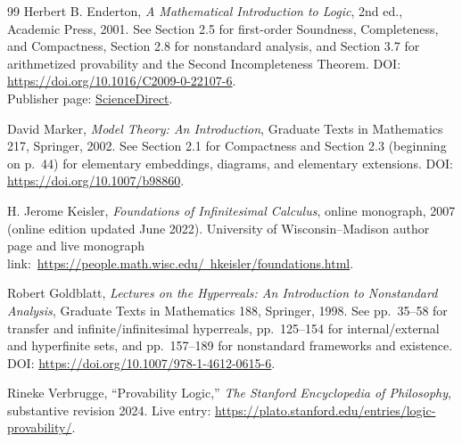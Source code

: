 \documentclass[11pt,openany]{book}
\theoremstyle{definition}
\theoremstyle{remark}
\begin{document}
\begin{thebibliography}{99}
Herbert B. Enderton,
\emph{A Mathematical Introduction to Logic}, 2nd ed., Academic Press, 2001.
See Section 2.5 for first-order Soundness, Completeness, and Compactness, Section 2.8 for nonstandard analysis, and Section 3.7 for arithmetized provability and the Second Incompleteness Theorem.
DOI: \href{https://doi.org/10.1016/C2009-0-22107-6}{https://doi.org/10.1016/C2009-0-22107-6}.\\
Publisher page: \href{https://www.sciencedirect.com/book/9780122384523/a-mathematical-introduction-to-logic}{ScienceDirect}.

David Marker,
\emph{Model Theory: An Introduction}, Graduate Texts in Mathematics 217, Springer, 2002.
See Section 2.1 for Compactness and Section 2.3 (beginning on p.~44) for elementary embeddings, diagrams, and elementary extensions.
DOI: \href{https://doi.org/10.1007/b98860}{https://doi.org/10.1007/b98860}.

H. Jerome Keisler,
\emph{Foundations of Infinitesimal Calculus}, online monograph, 2007 (online edition updated June 2022).
University of Wisconsin--Madison author page and live monograph link:\
\href{https://people.math.wisc.edu/~hkeisler/foundations.html}{https://people.math.wisc.edu/~hkeisler/foundations.html}.

Robert Goldblatt,
\emph{Lectures on the Hyperreals: An Introduction to Nonstandard Analysis}, Graduate Texts in Mathematics 188, Springer, 1998.
See pp.~35--58 for transfer and infinite/infinitesimal hyperreals, pp.~125--154 for internal/external and hyperfinite sets, and pp.~157--189 for nonstandard frameworks and existence.
DOI: \href{https://doi.org/10.1007/978-1-4612-0615-6}{https://doi.org/10.1007/978-1-4612-0615-6}.

Rineke Verbrugge,
``Provability Logic,'' \emph{The Stanford Encyclopedia of Philosophy}, substantive revision 2024.
Live entry: \href{https://plato.stanford.edu/entries/logic-provability/}{https://plato.stanford.edu/entries/logic-provability/}.

\end{thebibliography}
\end{document}
